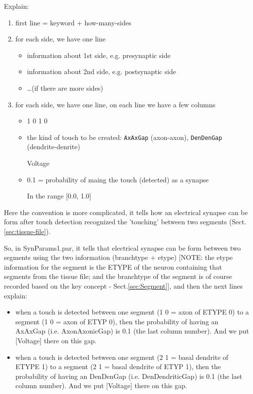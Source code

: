 Explain:
\begin{enumerate}
  \item first line = keyword + how-many-sides
  \item for each side, we have one line
  
  \begin{itemize}
  \item information about 1st side, e.g.
  presynaptic side
  \item information about 2nd side, e.g. postsynaptic side
  \item \ldots (if there are more sides)
  \end{itemize}
  
  \item for each side, we have one line, on each line we have a few columns
\begin{itemize}
  \item 1 0 1 0 
  \item the kind of touch to be created: \verb!AxAxGap! (axon-axon), 
  \verb!DenDenGap! (dendrite-denrite)
   
  \item [Voltage]
  \item 0.1  = probability of maing the touch (detected) as a synapse
  
  In the range [0.0, 1.0]
  
\end{itemize}  
\end{enumerate}

Here the convention is more complicated, it tells how an electrical synapse can
be form after touch detection recognized the 'touching' between two segments
(Sect.\ref{sec:tissue-file}). 

So, in SynParams1.par, it tells that electrical synapse can be form between two
segments using the two information (branchtype + etype) [NOTE: the etype
information for the segment is the ETYPE of the neuron containing that segments
from the tissue file; and the branchtype of the segment is of course recorded
based on the key concept - Sect.\ref{sec:Segment}], and then the next lines
explain: 
\begin{itemize}
  \item  when a touch is detected between one segment (1 0 = axon of
ETYPE 0) to a segment (1 0 = axon of ETYP 0), then the probability of
having an AxAxGap (i.e.
AxonAxonicGap) is 0.1 (the last column number). And we put [Voltage] there
on this gap.

  \item when a touch is detected between one segment (2 1 = basal dendrite of
ETYPE 1) to a segment (2 1 = basal dendrite of ETYP 1), then the
probability of having an DenDenGap (i.e.
DenDendriticGap) is 0.1 (the last column number). And we put [Voltage] there on
this gap.
\end{itemize}


